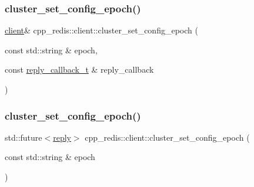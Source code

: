 \subsubsection{\texorpdfstring{cluster\+\_\+set\+\_\+config\+\_\+epoch()}{cluster\_set\_config\_epoch()}\hspace{0.1cm}{\footnotesize\ttfamily [1/2]}}
{\footnotesize\ttfamily \hyperlink{classcpp__redis_1_1client}{client}\& cpp\+\_\+redis\+::client\+::cluster\+\_\+set\+\_\+config\+\_\+epoch (\begin{DoxyParamCaption}\item[{const std\+::string \&}]{epoch,  }\item[{const \hyperlink{classcpp__redis_1_1client_a061a1140d36d2eaeda82b09a0bb3f9f2}{reply\+\_\+callback\+\_\+t} \&}]{reply\+\_\+callback }\end{DoxyParamCaption})}

\mbox{\label{classcpp__redis_1_1client_a0be11e04ce58a13e2e40272be1fad788}} 
\subsubsection{\texorpdfstring{cluster\+\_\+set\+\_\+config\+\_\+epoch()}{cluster\_set\_config\_epoch()}\hspace{0.1cm}{\footnotesize\ttfamily [2/2]}}
{\footnotesize\ttfamily std\+::future$<$\hyperlink{classcpp__redis_1_1reply}{reply}$>$ cpp\+\_\+redis\+::client\+::cluster\+\_\+set\+\_\+config\+\_\+epoch (\begin{DoxyParamCaption}\item[{const std\+::string \&}]{epoch }\end{DoxyParamCaption})}

\mbox{\label{classcpp__redis_1_1client_aeba14289869fe871eb9eb9c2503635a8}} 
